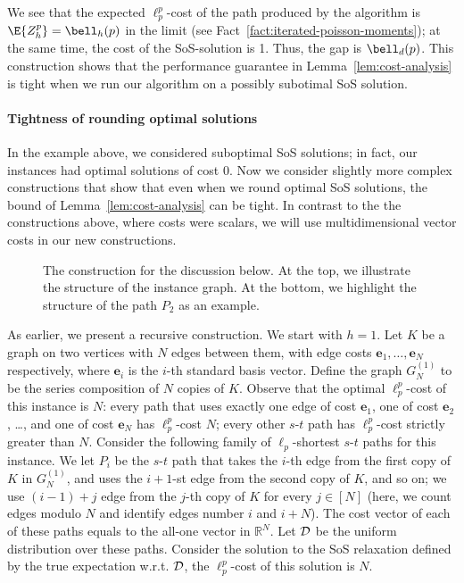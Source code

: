\documentclass[11pt,a4paper]{article}
\begin{document}
We see that the expected $\ell_p^p$-cost of the path produced by the algorithm is $\E{Z_h^p} = \bell_h(p)$ in the limit (see Fact~\ref{fact:iterated-poisson-moments}); at the same time, the cost of the SoS-solution is 1. Thus, the gap is $\bell_d(p)$. This construction shows that the performance guarantee in Lemma~\ref{lem:cost-analysis} is tight when we run our algorithm on a possibly subotimal SoS solution. 

\paragraph{Tightness of rounding optimal solutions} In the example above, we considered suboptimal SoS solutions; in fact, our instances had optimal solutions of cost 0. Now we consider slightly more complex constructions that show that even when we round optimal SoS solutions, the bound of Lemma~\ref{lem:cost-analysis} can be tight. In contrast to the the constructions above, where costs were scalars, we will use multidimensional vector costs in our new constructions.

\begin{figure}[t]
    \centering
    
    
    \caption{The construction for the discussion below. At the top, we illustrate the structure of the instance graph. At the bottom, we highlight the structure of the path $P_2$ as an example.}
    \label{fig:third-tightness-proof}
\end{figure}

As earlier, we present a recursive construction. We start with $h=1$. Let $K$ be a graph on two vertices with $N$ edges between them, with edge costs $\mathbf{e}_1, \dots ,\mathbf{e}_N$ respectively, where $\mathbf{e}_i$ is the $i$-{th} standard basis vector. Define the graph $G_N^{(1)}$ to be the series composition of $N$ copies of $K$. Observe that the optimal $\ell_p^p$-cost of this instance is $N$: every path that uses exactly one edge of cost $\mathbf{e}_1$, one of cost $\mathbf{e}_2$, \dots, and one of cost $\mathbf{e}_N$ has $\ell_p^p$-cost $N$; every other $s$-$t$ path has $\ell_p^p$-cost strictly greater than $N$. Consider the following family of $\ell_p$-shortest $s$-$t$ paths for this instance. We let $P_i$ be the $s$-$t$ path that takes the $i$-{th} edge from the first copy of $K$ in $G_{N}^{(1)}$, and uses the $i+1$-{st} edge from the second copy of $K$, and so on; we use $(i - 1) + j$ edge from the $j$-{th} copy of $K$ for every $j\in [N]$ (here, we count edges modulo $N$ and identify edges number $i$ and $i+N$). The cost vector of each of these paths equals to the all-one vector in $\mathbb{R}^N$. Let $\cal D$ be the uniform distribution over these paths. Consider the solution to the SoS relaxation defined by the true expectation w.r.t. $\cal D$, the $\ell_p^p$-cost of this solution is $N$. 
\end{document}
